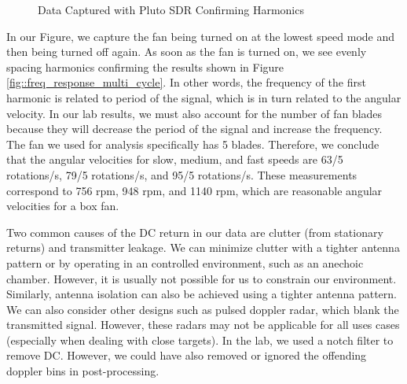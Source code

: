 \documentclass{article}
\begin{document}
\begin{figure}[H]
    	\centering
    	\caption{Data Captured with Pluto SDR Confirming Harmonics}
    	\label{fig::dopp_harmonics}
\end{figure}

\noindent In our Figure, we capture the fan being turned on at the lowest speed mode and then being turned off again. As soon as the fan is turned on, we see evenly spacing harmonics confirming the results shown in Figure \ref{fig::freq_response_multi_cycle}. In other words, the frequency of the first harmonic is related to period of the signal, which is in turn related to the angular velocity. In our lab results, we must also account for the number of fan blades because they will decrease the period of the signal and increase the frequency. The fan we used for analysis specifically has 5 blades. Therefore, we conclude that the angular velocities for slow, medium, and fast speeds are 63/5 rotations/s, 79/5 rotations/s, and 95/5 rotations/s. These measurements correspond to 756 rpm, 948 rpm, and 1140 rpm, which are reasonable angular velocities for a box fan.

Two common causes of the DC return in our data are clutter (from stationary returns) and transmitter leakage. We can minimize clutter with a tighter antenna pattern or by operating in an controlled environment, such as an anechoic chamber. However, it is usually not possible for us to constrain our environment. Similarly, antenna isolation can also be achieved using a tighter antenna pattern. We can also consider other designs such as pulsed doppler radar, which blank the transmitted signal. However, these radars may not be applicable for all uses cases (especially when dealing with close targets). In the lab, we used a notch filter to remove DC. However, we could have also removed or ignored the offending doppler bins in post-processing.
\end{document}
